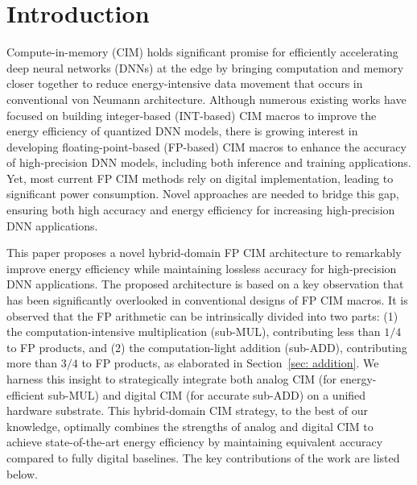 
\section{Introduction}
\label{sec:intro}



Compute-in-memory (CIM) holds significant promise for efficiently accelerating deep neural networks (DNNs) at the edge by bringing computation and memory closer together to reduce energy-intensive data movement that occurs in conventional von Neumann architecture\cite{wu2023floating, su20228, cao2023d, cao2021neural}.
Although numerous existing works have focused on building integer-based (INT-based) CIM macros\cite{dong202015,TSMC_CIM,SRAM_CIM_INT_1,sun2023efficient,9162917} to improve the energy efficiency of quantized DNN models, there is growing interest in developing floating-point-based (FP-based) CIM macros to enhance the accuracy of high-precision DNN models, including both inference and training applications.
Yet, most current FP CIM methods rely on digital implementation, leading to significant power consumption\cite{SRAM_CIM_FP_1,Sparse_intense,reCIM}.
Novel approaches are needed to bridge this gap, ensuring both high accuracy and energy efficiency for increasing high-precision DNN applications.




This paper proposes a novel hybrid-domain FP CIM architecture to remarkably improve energy efficiency while maintaining lossless accuracy for high-precision DNN applications.
The proposed architecture is based on a key observation that has been significantly overlooked in conventional designs of FP CIM macros.
It is observed that the FP arithmetic can be intrinsically divided into two parts: (1) the computation-intensive multiplication (sub-MUL), contributing less than $1/4$ to FP products, and (2) the computation-light addition (sub-ADD), contributing more than $3/4$ to FP products, as elaborated in Section~\ref{sec: addition}. 
We harness this insight to strategically integrate both analog CIM (for energy-efficient sub-MUL) and digital CIM (for accurate sub-ADD) on a unified hardware substrate.
This hybrid-domain CIM strategy, to the best of our knowledge, optimally combines the strengths of analog and digital CIM to achieve state-of-the-art energy efficiency by maintaining equivalent accuracy compared to fully digital baselines.
The key contributions of the work are listed below.


